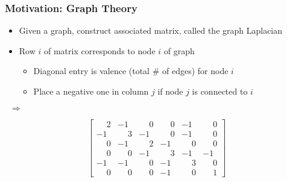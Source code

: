 \documentclass[10pt]{beamer}
\begin{document}
\begin{frame}
\frametitle{Motivation: Graph Theory}
\begin{itemize}
    \item Given a graph, construct associated matrix, called the graph Laplacian
    \item Row $i$ of matrix corresponds to node $i$ of graph
    \begin{itemize}
        \item Diagonal entry is valence (total \# of edges) for node $i$
        \item Place a negative one in column $j$ if node $j$ is connected to $i$
    \end{itemize}
\end{itemize}
\begin{minipage}{.4\linewidth} 
\bigskip
\begin{center}
\end{center}
\end{minipage}
$\;\; \Rightarrow \;\;$
\begin{minipage}{.4\linewidth} 
\bigskip
\begin{center}
\begin{equation*}
       \begin{bmatrix} \phantom{-} 2  & -1            &  \phantom{-}0 &  \phantom{-}0 &            -1 &  \phantom{-}0 \\ 
                       -1             &  \phantom{-}3 & -1            &  \phantom{-}0 &            -1 &  \phantom{-}0 \\ 
                        \phantom{-}0  & -1            &  \phantom{-}2 &            -1 &  \phantom{-}0 &  \phantom{-}0 \\ 
                        \phantom{-}0  &  \phantom{-}0 & -1            & \phantom{-} 3 &            -1 & -1 \\ 
                       -1             & -1            &  \phantom{-}0 & -1            &  \phantom{-}3 &  \phantom{-}0 \\ 
                        \phantom{-}0  &  \phantom{-}0 &  \phantom{-}0 & -1            &  \phantom{-}0 &  \phantom{-}1  
        \end{bmatrix}
\end{equation*}
\end{center}
\end{minipage}
\end{frame}
\end{document}
